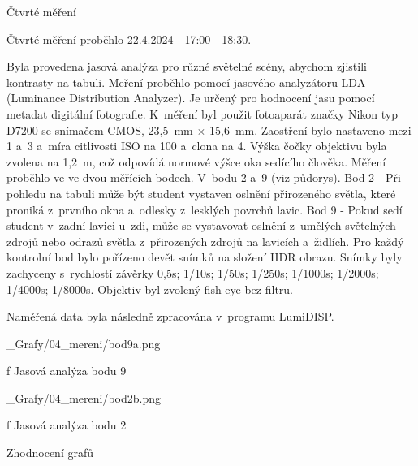 \sec Čtvrté měření

Čtvrté měření proběhlo 22.4.2024 - 17:00 - 18:30.

Byla provedena jasová analýza pro různé světelné scény, abychom zjistili kontrasty na tabuli.
Meření proběhlo pomocí jasového analyzátoru LDA (Luminance Distribution Analyzer). Je určený pro hodnocení
jasu pomocí metadat digitální fotografie.
\medskip
K~měření byl použit fotoaparát značky Nikon typ D7200 se snímačem CMOS, 23,5~mm $\times$ 15,6~mm.
Zaostření bylo nastaveno mezi 1 a~3 a~míra citlivosti ISO na 100 a~clona na 4. Výška čočky
objektivu byla zvolena na 1,2~m, což odpovídá normové výšce oka sedícího člověka.
\medskip
Měření proběhlo ve ve dvou měřících bodech. V~bodu 2 a~9 (viz půdorys).
\medskip
Bod 2 - Při pohledu na tabuli může být student vystaven oslnění přirozeného světla, které proniká z~prvního
okna a~odlesky z~lesklých povrchů lavic.
\medskip
Bod 9 -  Pokud sedí student v~zadní lavici u~zdi, může se vystavovat oslnění z~umělých světelných zdrojů nebo
odrazů světla z~přirozených zdrojů na lavicích a~židlích.
\medskip
Pro každý kontrolní bod bylo pořízeno devět snímků na složení HDR obrazu. Snímky
byly zachyceny s~rychlostí závěrky 0,5s; 1/10s; 1/50s; 1/250s; 1/1000s; 1/2000s; 1/4000s; 1/8000s. Objektiv byl
zvolený fish eye bez filtru.

Naměřená data byla následně zpracována v~programu LumiDISP.

\medskip
\medskip {}
\picw=14cm _Grafy/04_mereni/bod9a.png
\caption/f Jasová analýza bodu 9
\medskip

\medskip
\medskip {}
\picw=14cm _Grafy/04_mereni/bod2b.png
\caption/f Jasová analýza bodu 2
\medskip
\medskip


Zhodnocení grafů





